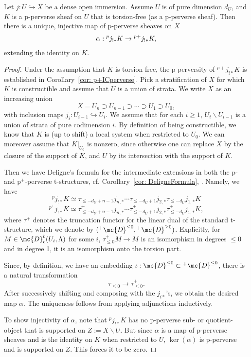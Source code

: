 \begin{proposition}\label{prop: InjectiveAlpha}
    Let $j:U\hookrightarrow X$ be a dense open immersion. Assume $U$ is of pure dimension $d_U$, and $K$ is a p-perverse sheaf on $U$ that is torsion-free (as a p-perverse sheaf). Then there is a unique, injective map of p-perverse sheaves on $X$
    \begin{equation}{\label{eqn: alphamap}}
    \alpha:{}^pj_{!\ast} K\to {}^{p+}j_{!\ast}K,
    \end{equation}
    extending the identity on $K$.
\end{proposition}
\begin{proof}
    Under the assumption that $K$ is torsion-free, the p-perversity of ${}^{p+}j_{!\ast}K$ is established in Corollary~\ref{cor: p+ICperverse}. Pick a stratification of $X$ for which $K$ is constructible and assume that $U$ is a union of strata. We write $X$ as an increasing union
    \[X=U_n\supset U_{n-1}\supset \cdots \supset U_1\supset U_0,\]
    with inclusion maps $j_i: U_{i-1}\hookrightarrow U_i$. We assume that for each $i\geq 1$, $U_i\backslash U_{i-1}$ is a union of strata of pure codimension $i$. By definition of being constructible, we know that $K$ is (up to shift) a local system when restricted to $U_0$. We can moreover assume that $K|_{U_0}$ is nonzero, since otherwise one can replace $X$ by the closure of the support of $K$, and $U$ by its intersection with the support of $K$.
    
    Then we have Deligne's formula for the intermediate extensions in both the p- and p$^+$-perverse t-structures, cf. Corollary~\ref{cor: DeligneFormula}, \cite[\S 2.3]{JMW}. Namely, we have
    \begin{equation*}
    {}^pj_{!\ast}K\simeq \tau_{\leq -d_U+n-1}j_{n,\ast}\cdots \tau_{\leq -d_U+1} j_{2,\ast}\tau_{\leq -d_U} j_{1,\ast}K
    \end{equation*}
    \begin{equation*}
    {}^{p^+}j_{!\ast}K\simeq \tau^+_{\leq -d_U+n-1}j_{n,\ast}\cdots \tau^+_{\leq -d_U+1} j_{2,\ast}\tau^+_{\leq -d_U} j_{1,\ast}K,
    \end{equation*}
    where $\tau^+$ denotes the truncation functor for the linear dual of the standard t-structure, which we denote by $({}^+\mc{D}^{\leq 0}, {}^+\mc{D}^{\geq 0})$. Explicitly, for $M\in \mc{D}^b_{\mathrm{c}}(U_i,\Lambda)$ for some $i$, $\tau^+_{\leq 0}M\to M$ is an isomorphism in degrees $\leq 0$ and in degree 1, it is an isomorphism onto the torsion part. 
    
    Since, by definition, we have an embedding $\iota: \mc{D}^{\leq 0}\subset {}^{+}\mc{D}^{\leq 0}$, there is a natural transformation
    \[\tau_{\leq 0}\to \tau^+_{\leq 0}.\]
    After successively shifting and composing with the $j_{i\ast}$'s, we obtain the desired map $\alpha$. The uniqueness follows from applying adjunctions inductively.

    To show injectivity of $\alpha$, note that ${}^pj_{!\ast}K$ has no p-perverse sub- or quotient-object that is supported on  $Z:=X\backslash U$. But since $\alpha$ is a map of p-perverse sheaves and is the identity on $K$ when restricted to $U$, $\operatorname{ker}(\alpha)$ is p-perverse and is supported on $Z$. This forces it to be zero. 
\end{proof}
